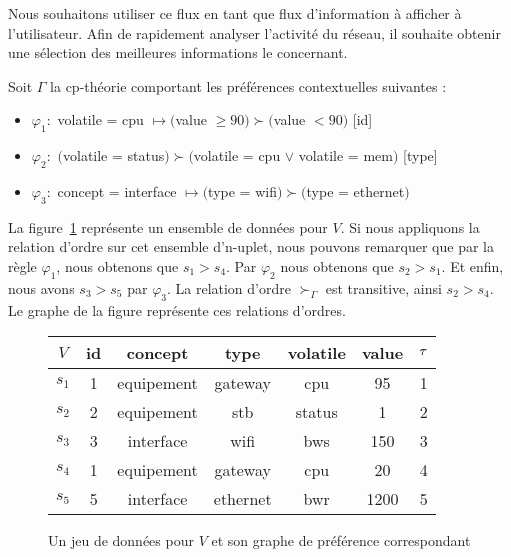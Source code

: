 Nous souhaitons utiliser ce flux en tant que flux d'information à afficher à l'utilisateur. Afin de rapidement analyser l'activité du réseau, il souhaite obtenir une sélection des meilleures informations le concernant.

Soit $\Gamma$ la cp-théorie comportant les préférences contextuelles suivantes :
\begin{itemize}
	\item $\varphi_1 : $ volatile = cpu $\mapsto ($value $ \geq 90) \succ ($value $ < 90)$ [id]
	\item $\varphi_2 : $ $($volatile = status$) \succ ($volatile = cpu $ \vee $ volatile = mem$)$ [type]
	\item $\varphi_3 : $ concept = interface $\mapsto ($type = wifi$) \succ ($type = ethernet$)$
\end{itemize}

La figure~\ref{fig:valid:domvision:architecture:pref} représente un ensemble de données pour $V$. Si nous appliquons la relation d'ordre sur cet ensemble d'n-uplet, nous pouvons remarquer que par la règle $\varphi_1$, nous obtenons que $s_1 > s_4$. Par $\varphi_2$ nous obtenons que $s_2 > s_1$. Et enfin, nous avons $s_3 > s_5$ par $\varphi_3$. La relation d'ordre $\succ_\Gamma$ est transitive, ainsi $s_2 > s_4$. Le graphe de la figure représente ces relations d'ordres.
\begin{figure}[ht]\centering
\begin{tabular}{|c|c|c|c|c|c|c|} \bottomrule
\rowcolor{hypcolor} $V$ & id & concept & type & volatile & value & $\tau$\\ \hline
$s_1$ & 1 & equipement & gateway & cpu & 95 & 1\\ \hline %
$s_2$ & 2 & equipement & stb & status & 1 & 2\\ \hline %
$s_3$ & 3 & interface & wifi & bws & 150 & 3\\ \hline %
$s_4$ & 1 & equipement & gateway & cpu & 20 & 4\\ \hline
$s_5$ & 5 & interface & ethernet & bwr & 1200 & 5\\ \toprule %
\end{tabular}\hspace{1cm}
\begin{minipage}{3cm}
\end{minipage}
\caption{Un jeu de données pour $V$ et son graphe de préférence correspondant}\label{fig:valid:domvision:architecture:pref}
\end{figure}

